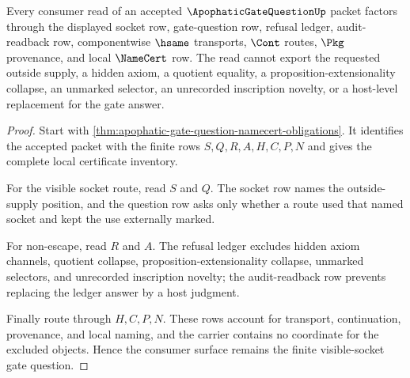\begin{theorem}
\label{thm:apophatic-gate-question-visible-socket-nonescape}
Every consumer read of an accepted $\ApophaticGateQuestionUp$ packet factors through the displayed socket row, gate-question row, refusal ledger, audit-readback row, componentwise $\hsame$ transports, $\Cont$ routes, $\Pkg$ provenance, and local $\NameCert$ row. The read cannot export the requested outside supply, a hidden axiom, a quotient equality, a proposition-extensionality collapse, an unmarked selector, an unrecorded inscription novelty, or a host-level replacement for the gate answer.
\end{theorem}
\begin{proof}
Start with \autoref{thm:apophatic-gate-question-namecert-obligations}. It identifies the accepted packet with the finite rows $S,Q,R,A,H,C,P,N$ and gives the complete local certificate inventory.

For the visible socket route, read $S$ and $Q$. The socket row names the outside-supply position, and the question row asks only whether a route used that named socket and kept the use externally marked.

For non-escape, read $R$ and $A$. The refusal ledger excludes hidden axiom channels, quotient collapse, proposition-extensionality collapse, unmarked selectors, and unrecorded inscription novelty; the audit-readback row prevents replacing the ledger answer by a host judgment.

Finally route through $H,C,P,N$. These rows account for transport, continuation, provenance, and local naming, and the carrier contains no coordinate for the excluded objects. Hence the consumer surface remains the finite visible-socket gate question.
\end{proof}

